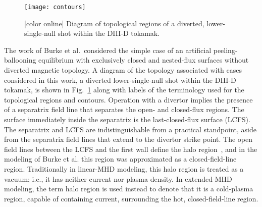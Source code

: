 \documentclass[english,aps,superscriptaddress,showkeys,showpacs,prepri,twocolumn]{revtex4}
\begin{document}
\begin{figure}
\begin{center}
\texttt{[image: contours]}
\caption{ [color online]
Diagram of topological regions of a diverted, lower-single-null shot within the
DIII-D tokamak.
}
\label{fig:contours}
\end{center}
\end{figure}

The work of Burke et al.\ considered the simple case of an artificial
peeling-ballooning equilibrium with exclusively closed and nested-flux surfaces
without diverted magnetic topology. A diagram of the topology associated with
cases considered in this
work, a diverted lower-single-null shot within the DIII-D tokamak, is shown in
Fig.~\ref{fig:contours} along with labels of the terminology used for the
topological regions and contours. Operation with a divertor implies the
presence of a separatrix field line that separates the open- and closed-flux
regions. The surface immediately inside the separatrix is the last-closed-flux
surface (LCFS). The separatrix and LCFS are indistinguishable from a practical
standpoint, aside from the separatrix field lines that extend to the divertor
strike point. The open field lines between the LCFS and the first wall define
the halo region~\cite{strauss2004mhd,Kruger:2005dc}, and in the modeling of
Burke et al.  this region was approximated as a closed-field-line region.
Traditionally in linear-MHD modeling, this halo region is treated as a vacuum;
i.e., it has neither current nor plasma density. In extended-MHD modeling, the
term halo region is used instead to denote that it is a cold-plasma region,
capable of containing current, surrounding the hot, closed-field-line region. 

\end{document}
